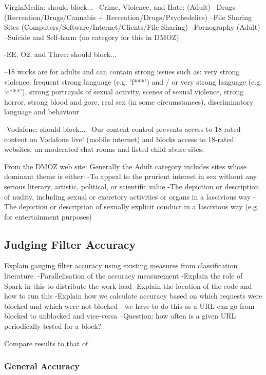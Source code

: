 \documentclass{bmcart}
\begin{document}
VirginMedia: should block...
--Crime, Violence, and Hate: (Adult)
--Drugs (Recreation/Drugs/Cannabis + Recreation/Drugs/Psychedelics)
--File Sharing Sites (Computers/Software/Internet/Clients/File Sharing)
--Pornography (Adult)
--Suicide and Self-harm (no category for this in DMOZ)


-EE, O2, and Three: should block...

--18 works are for adults and can contain strong issues such as: very strong violence, frequent strong language (e.g. 'f***') and / or very strong language (e.g. ‘c***’), strong portrayals of sexual activity, scenes of sexual violence, strong horror, strong blood and gore, real sex (in some circumstances), discriminatory language and behaviour

-Vodafone: should block...
--Our content control prevents access to 18-rated content on Vodafone live! (mobile internet) and blocks access to 18-rated websites, un-moderated chat rooms and listed child abuse sites.



From the DMOZ web site: 
Generally the Adult category includes sites whose dominant theme is either:
-To appeal to the prurient interest in sex without any serious literary, artistic, political, or scientific value
-The depiction or description of nudity, including sexual or excretory activities or organs in a lascivious way
-The depiction or description of sexually explicit conduct in a lascivious way (e.g. for entertainment purposes)



\subsection*{Judging Filter Accuracy}

Explain gauging filter accuracy using existing measures from classification literature.
-Parallelisation of the accuracy measurement
-Explain the role of Spark in this to distribute the work load
-Explain the location of the code and how to run this
-Explain how we calculate accuracy based on which requests were blocked and which were not blocked - we have to do this as a URL can go from blocked to unblocked and vice-versa
--Question: how often is a given URL periodically tested for a block?

Compare results to that of \cite{stark2007effectiveness}

\subsubsection*{General Accuracy}
\end{document}

